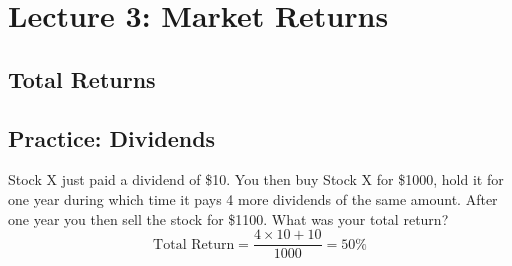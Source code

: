 \documentclass[11pt]{article}
\theoremstyle{definition}
\begin{document}
\section{Lecture 3: Market Returns}

\subsection{Total Returns}
    \begin{shaded}
    \subsection{Practice: Dividends}
     Stock X just paid a dividend of \$10.  You then buy Stock X for \$1000, hold it for one year during which time it pays 4 more dividends of the same amount.   After one year you then sell the stock for \$1100.  What was your total return?\\
     \vspace{1em}
    $$ \text{Total Return} = \frac{4\times10 + 10}{1000} = 50\% $$
    
    \end{shaded}
\end{document}
